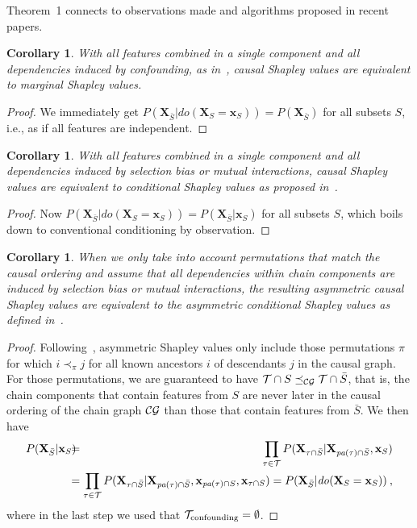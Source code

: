 \documentclass{article}
\newcommand{\vX}{\mathbf{X}}
\newcommand{\vx}{\mathbf{x}}
\newcommand{\dodo}{\mathit{do}}
\newcommand{\lvdo}[1]{\dodo(\vX_{#1} = \vx_{#1})}
\newcommand{\spa}{\mathop{\textit{\scriptsize pa}}}
\newcommand{\perm}{\pi}
\newcommand{\onder}[2]{{#1}_{\mbox{\scriptsize #2}}}
\newcommand{\isequal}{\hspace*{-2.5mm} & = & \hspace*{-2.5mm}}
\newcommand{\chaincomponents}{{\cal T}}
\newtheorem{corollary}[theorem]{Corollary}
\begin{document}
Theorem~1 connects to observations made and algorithms proposed in recent papers.
\begin{corollary}
	With all features combined in a single component and all dependencies induced by confounding, as in~\cite{janzing2019feature}, causal Shapley values are equivalent to marginal Shapley values. 
\end{corollary}
\begin{proof}
	We immediately get $P(\vX_{\bar{S}}|\lvdo{S}) = P(\vX_{\bar{S}})$ for all subsets $S$, i.e., as if all features are independent.
\end{proof}
\begin{corollary}
	With all features combined in a single component and all dependencies induced by selection bias or mutual interactions, causal Shapley values are equivalent to conditional Shapley values as proposed in~\cite{aas2019explaining}.
\end{corollary}
\begin{proof}
	Now $P(\vX_{\bar{S}}|\lvdo{S}) = P(\vX_{\bar{S}}|\vx_{S})$ for all subsets $S$, which boils down to conventional conditioning by observation.
\end{proof}
\begin{corollary}
	When we only take into account permutations that match the causal ordering and assume that all dependencies within chain components are induced by selection bias or mutual interactions, the resulting asymmetric causal Shapley values are equivalent to the asymmetric conditional Shapley values as defined in~\cite{frye2019asymmetric}.
\end{corollary}
\begin{proof}
	Following~\cite{frye2019asymmetric}, asymmetric Shapley values only include those permutations $\perm$ for which $i \prec_\perm j$ for all known ancestors $i$ of descendants $j$ in the causal graph. For those permutations, we are guaranteed to have $\chaincomponents \cap S \preceq_{{\cal CG}} \chaincomponents \cap \bar{S}$, that is, the chain components that contain features from $S$ are never later in the causal ordering of the chain graph ${\cal CG}$ than those that contain features from $\bar{S}$. We then have
	\begin{eqnarray*}
	P(\vX_{\bar{S}}|\vx_S) \isequal \prod_{\tau \in \chaincomponents} P(\vX_{\tau \cap \bar{S}}|\vX_{\spa(\tau)  \cap \bar{S}},\vx_{S}) \\
	\isequal \prod_{\tau \in \chaincomponents} P(\vX_{\tau \cap \bar{S}}|\vX_{\spa(\tau)  \cap \bar{S}},\vx_{\spa(\tau) \cap S},\vx_{\tau \cap S}) = P(\vX_{\bar{S}}|\lvdo{S}) \: ,
	\end{eqnarray*}
	where in the last step we used that $\onder{\chaincomponents}{confounding} = \emptyset$.
\end{proof}
\end{document}
